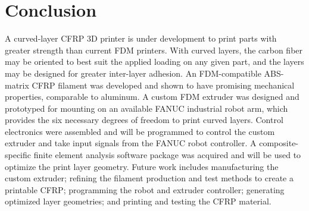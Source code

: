\section{Conclusion}

\indent

A curved-layer CFRP 3D printer is under development to print parts with greater strength than current FDM printers. With curved layers, the carbon fiber may be oriented to best suit the applied loading on any given part, and the layers may be designed for greater inter-layer adhesion. An FDM-compatible ABS-matrix CFRP filament was developed and shown to have promising mechanical properties, comparable to aluminum. A custom FDM extruder was designed and prototyped for mounting on an available FANUC industrial robot arm, which provides the six necessary degrees of freedom to print curved layers. Control electronics were assembled and will be programmed to control the custom extruder and take input signals from the FANUC robot controller. A composite-specific finite element analysis software package was acquired and will be used to optimize the print layer geometry. Future work includes manufacturing the custom extruder; refining the filament production and test methods to create a printable CFRP; programming the robot and extruder controller; generating optimized layer geometries; and printing and testing the CFRP material. \\

